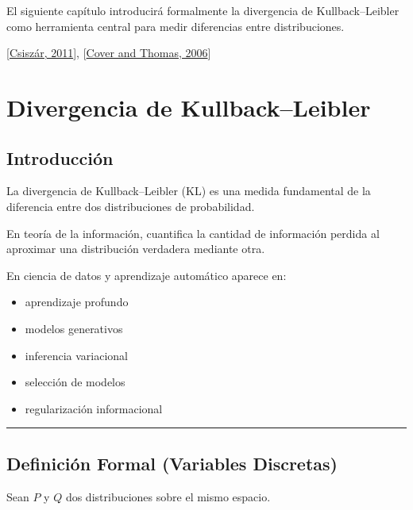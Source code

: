 \documentclass[letterpaper,10pt,english]{jupyterBook}
\begin{document}
\sphinxAtStartPar
El siguiente capítulo introducirá formalmente la divergencia de
Kullback–Leibler como herramienta central para medir diferencias
entre distribuciones.

\sphinxAtStartPar
{[}\hyperlink{cite.05_appendices/references:id10}{Csiszár, 2011}{]}, {[}\hyperlink{cite.05_appendices/references:id2}{Cover and Thomas, 2006}{]}

\sphinxstepscope


\chapter{Divergencia de Kullback–Leibler}
\label{\detokenize{02_mathematical_foundations/kl_divergence:divergencia-de-kullbackleibler}}\label{\detokenize{02_mathematical_foundations/kl_divergence::doc}}

\section{Introducción}
\label{\detokenize{02_mathematical_foundations/kl_divergence:introduccion}}
\sphinxAtStartPar
La divergencia de Kullback–Leibler (KL) es una medida fundamental
de la diferencia entre dos distribuciones de probabilidad.

\sphinxAtStartPar
En teoría de la información, cuantifica la cantidad de información
perdida al aproximar una distribución verdadera mediante otra.

\sphinxAtStartPar
En ciencia de datos y aprendizaje automático aparece en:
\begin{itemize}
\item {} 
\sphinxAtStartPar
aprendizaje profundo

\item {} 
\sphinxAtStartPar
modelos generativos

\item {} 
\sphinxAtStartPar
inferencia variacional

\item {} 
\sphinxAtStartPar
selección de modelos

\item {} 
\sphinxAtStartPar
regularización informacional

\end{itemize}


\bigskip\hrule\bigskip



\section{Definición Formal (Variables Discretas)}
\label{\detokenize{02_mathematical_foundations/kl_divergence:definicion-formal-variables-discretas}}
\sphinxAtStartPar
Sean \(P\) y \(Q\) dos distribuciones sobre el mismo espacio.
\end{document}
